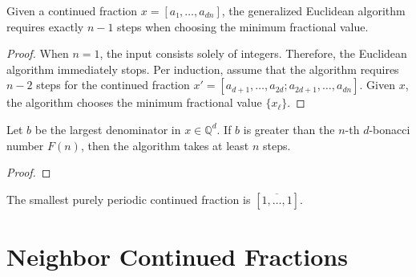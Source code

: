 \begin{lemma}
  Given a continued fraction $x = [a₁, \dots, a_{dn}]$,
  the generalized Euclidean algorithm requires exactly $n - 1$ steps
  when choosing the minimum fractional value.
\end{lemma}

\begin{proof}
  When $n = 1$, the input consists solely of integers.
  Therefore, the Euclidean algorithm immediately stops.
  Per induction, assume that the algorithm requires $n - 2$ steps for
  the continued fraction $x' = [a_{d+1}, \dots, a_{2d}; a_{2d+1}, \dots, a_{dn}]$.
  Given $x$, the algorithm chooses the minimum fractional value $\{x_ℓ\}$.
\end{proof}

\begin{lemma}
  Let $b$ be the largest denominator in $x ∈ ℚ^d$.
  If $b$ is greater than the $n$-th $d$-bonacci number $F(n)$,
  then the algorithm takes at least $n$ steps.
\end{lemma}

\begin{proof}
\end{proof}

The smallest purely periodic continued fraction is $[\overline{1, \dots, 1}]$.

\section{Neighbor Continued Fractions}

